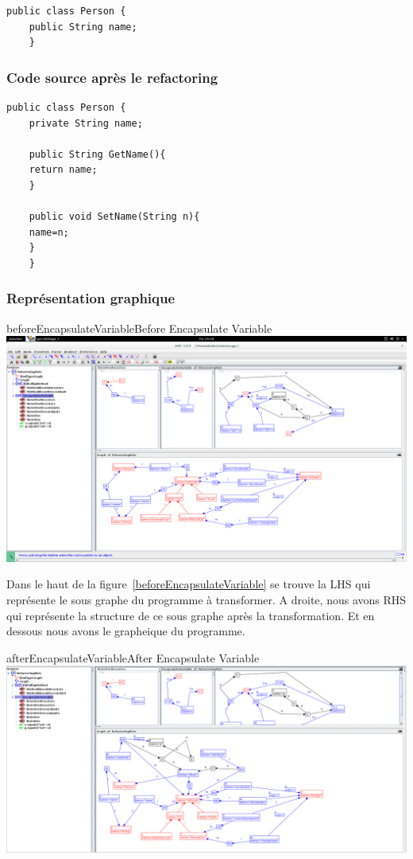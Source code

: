 \documentclass[a4paper, 12pt]{article}
\begin{document}
  \begin{lstlisting}[frame=single]
    public class Person {
    public String name;
    }
  \end{lstlisting}

  \subsubsection{Code source après le refactoring}

  \begin{lstlisting}[frame=single]
    public class Person {
    private String name;

    public String GetName(){
    return name;
    }

    public void SetName(String n){
    name=n;
    }
    }
  \end{lstlisting}

  \subsubsection{Représentation graphique}

  \begin{myfig}{beforeEncapsulateVariable}{Before Encapsulate Variable}
    \includegraphics[width=\textwidth]{beforeEncapsulateVariable.png}
  \end{myfig}

  Dans le haut de la figure~\ref{beforeEncapsulateVariable} se trouve la LHS qui représente le sous graphe du programme à transformer.
  A droite, nous avons RHS qui représente la structure de ce sous graphe après la transformation.
  Et en dessous nous avons le grapheique du programme.

  \begin{myfig}{afterEncapsulateVariable}{After Encapsulate Variable}
    \includegraphics[width=\textwidth]{afterEncapsulateVariable.png}
  \end{myfig}
\end{document}
